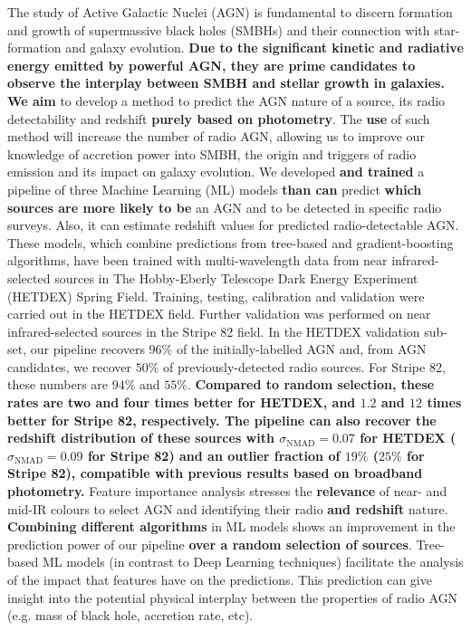 \documentclass{aa}
\begin{document}
   \date{Received ; accepted }

 
  \abstract
   {The study of Active Galactic Nuclei (AGN) is fundamental to discern formation and growth of supermassive black holes (SMBHs) and their connection with star-formation and galaxy evolution. \textbf{Due to the significant kinetic and radiative energy emitted by powerful AGN, they are prime candidates to observe the interplay between SMBH and stellar growth in galaxies.}
   }
   {\textbf{We aim} to develop a method to predict the AGN nature of a source, its radio detectability and redshift \textbf{purely based on photometry}. The \textbf{use} of such method will increase the number of radio AGN, allowing us to improve our knowledge of accretion power into SMBH, the origin and triggers of radio emission and its impact on galaxy evolution.   
   }
   {We developed \textbf{and trained} a pipeline of three Machine Learning (ML) models \textbf{than can} predict \textbf{which sources are more likely to be} an AGN and to be detected in specific radio surveys. Also, it can estimate redshift values for predicted radio-detectable AGN. These models, which combine predictions from tree-based and gradient-boosting algorithms, have been trained with multi-wavelength data from near infrared-selected sources in The Hobby-Eberly Telescope Dark Energy Experiment (HETDEX) Spring Field. Training, testing, calibration and validation were carried out in the HETDEX field. Further validation was performed on near infrared-selected sources in the Stripe 82 field.
   }
   {In the HETDEX validation sub-set, our pipeline recovers $96\%$ of the initially-labelled AGN and, from AGN candidates, we recover $50\%$ of previously-detected radio sources. For Stripe 82, these numbers are $94\%$ and $55\%$. \textbf{Compared to random selection, these rates are two and four times better for HETDEX, and $1.2$ and $12$ times better for Stripe 82, respectively. The pipeline can also recover the redshift distribution of these sources with $\sigma_{\mathrm{NMAD}} {=} 0.07$ for HETDEX ($\sigma_{\mathrm{NMAD}} {=} 0.09$ for Stripe 82) and an outlier fraction of $19\%$ ($25\%$ for Stripe 82), compatible with previous results based on broadband photometry.} Feature importance analysis stresses the \textbf{relevance} of near- and mid-IR colours to select AGN and identifying their radio \textbf{and redshift} nature.
   }
   {\textbf{Combining different algorithms} in ML models shows an improvement in the prediction power of our pipeline\textbf{ over a random selection of sources}. Tree-based ML models (in contrast to Deep Learning techniques) facilitate the analysis of the impact that features have on the predictions. This prediction can give insight into the potential physical interplay between the properties of radio AGN (e.g. mass of black hole, accretion rate, etc).}
\end{document}
